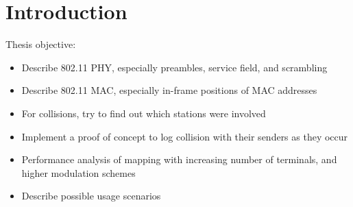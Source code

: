 \chapter{Introduction}\label{ch:introduction}

\glsresetall %


Thesis objective:

\begin{itemize}
	\item Describe 802.11 PHY, especially preambles, service field, and scrambling
	\item Describe 802.11 MAC, especially in-frame positions of MAC addresses
	\item For collisions, try to find out which stations were involved
	\item Implement a proof of concept to log collision with their senders as they occur
	\item Performance analysis of mapping with increasing number of terminals, and higher modulation schemes
	\item Describe possible usage scenarios
\end{itemize}
